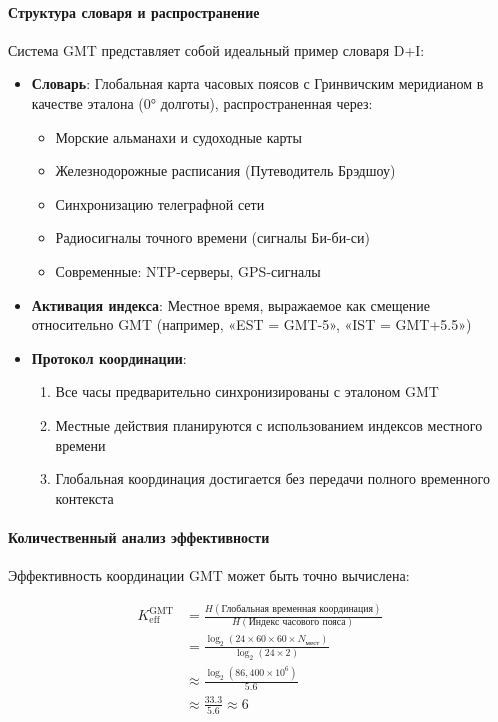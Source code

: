 \documentclass[11pt,a4paper]{article}
\begin{document}
	\paragraph{Структура словаря и распространение}
	Система GMT представляет собой идеальный пример словаря D+I:
	
	\begin{itemize}
		\item \textbf{Словарь}: Глобальная карта часовых поясов с Гринвичским меридианом в качестве эталона (0° долготы), распространенная через:
		\begin{itemize}
			\item Морские альманахи и судоходные карты
			\item Железнодорожные расписания (Путеводитель Брэдшоу)
			\item Синхронизацию телеграфной сети
			\item Радиосигналы точного времени (сигналы Би-би-си)
			\item Современные: NTP-серверы, GPS-сигналы
		\end{itemize}
		
		\item \textbf{Активация индекса}: Местное время, выражаемое как смещение относительно GMT (например, «EST = GMT-5», «IST = GMT+5.5»)
		
		\item \textbf{Протокол координации}: 
		\begin{enumerate}
			\item Все часы предварительно синхронизированы с эталоном GMT
			\item Местные действия планируются с использованием индексов местного времени
			\item Глобальная координация достигается без передачи полного временного контекста
		\end{enumerate}
	\end{itemize}
	
	\paragraph{Количественный анализ эффективности}
	Эффективность координации GMT может быть точно вычислена:
	
	\begin{align}
		K_{\mathrm{eff}}^{\mathrm{GMT}} &= \frac{H(\text{Глобальная временная координация})}{H(\text{Индекс часового пояса})} \\
		&= \frac{\log_2\left(24 \times 60 \times 60 \times N_{\text{мест}}\right)}{\log_2(24 \times 2)} \\
		&\approx \frac{\log_2(86,400 \times 10^6)}{5.6} \\
		&\approx \frac{33.3}{5.6} \approx 6
	\end{align}
	
\end{document}
